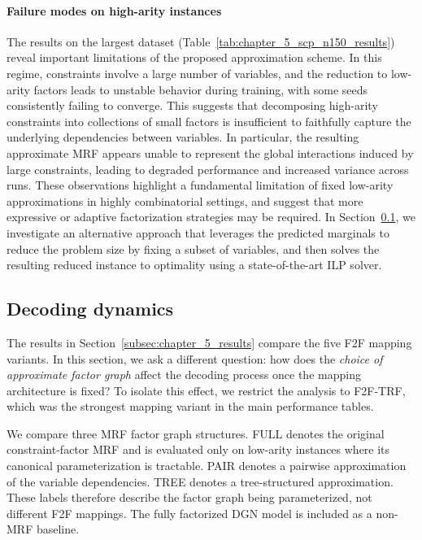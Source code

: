 \paragraph{Failure modes on high-arity instances}
The results on the largest dataset (Table~\ref{tab:chapter_5_scp_n150_results}) reveal important limitations of the proposed approximation scheme. In this regime, constraints involve a large number of variables, and the reduction to low-arity factors leads to unstable behavior during training, with some seeds consistently failing to converge. This suggests that decomposing high-arity constraints into collections of small factors is insufficient to faithfully capture the underlying dependencies between variables. In particular, the resulting approximate MRF appears unable to represent the global interactions induced by large constraints, leading to degraded performance and increased variance across runs. These observations highlight a fundamental limitation of fixed low-arity approximations in highly combinatorial settings, and suggest that more expressive or adaptive factorization strategies may be required. In Section~\ref{subsec:chapter_5_decoding_dynamics}, we investigate an alternative approach that leverages the predicted marginals to reduce the problem size by fixing a subset of variables, and then solves the resulting reduced instance to optimality using a state-of-the-art ILP solver.



\subsection{Decoding dynamics}
\label{subsec:chapter_5_decoding_dynamics} 

The results in Section~\ref{subsec:chapter_5_results} compare the five F2F mapping variants. In this section, we ask a different question: how does the \emph{choice of approximate factor graph} affect the decoding process once the mapping architecture is fixed? To isolate this effect, we restrict the analysis to F2F-TRF, which was the strongest mapping variant in the main performance tables.

We compare three MRF factor graph structures. FULL denotes the original constraint-factor MRF and is evaluated only on low-arity instances where its canonical parameterization is tractable. PAIR denotes a pairwise approximation of the variable dependencies. TREE denotes a tree-structured approximation. These labels therefore describe the factor graph being parameterized, not different F2F mappings. The fully factorized DGN model is included as a non-MRF baseline.


